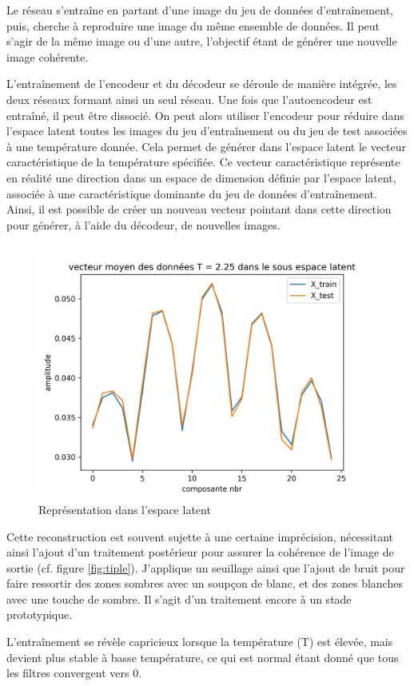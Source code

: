 \documentclass[11pt, parskip=half]{scrartcl} %
\begin{document}
Le réseau s'entraîne en partant d'une image du jeu de données d'entraînement, puis, cherche à reproduire une image du même ensemble de données. Il peut s'agir de la même image ou d'une autre, l'objectif étant de générer une nouvelle image cohérente.

L'entraînement de l'encodeur et du décodeur se déroule de manière intégrée, les deux réseaux formant ainsi un seul réseau. Une fois que l'autoencodeur est entraîné, il peut être dissocié. On peut alors utiliser l'encodeur pour réduire dans l'espace latent toutes les images du jeu d'entraînement ou du jeu de test associées à une température donnée. Cela permet de générer dans l'espace latent le vecteur caractéristique de la température spécifiée. Ce vecteur caractéristique représente en réalité une direction dans un espace de dimension définie par l'espace latent, associée à une caractéristique dominante du jeu de données d'entraînement. Ainsi, il est possible de créer un nouveau vecteur pointant dans cette direction pour générer, à l'aide du décodeur, de nouvelles images.

\begin{figure}[h]
	\centering
	\includegraphics[width=0.5\linewidth]{./figures/latent.jpg}
	\caption{Représentation dans l'espace latent}
	\label{fig:latent}
\end{figure}

Cette reconstruction est souvent sujette à une certaine imprécision, nécessitant ainsi l'ajout d'un traitement postérieur pour assurer la cohérence de l'image de sortie (cf. figure \ref{fig:tiple}). J'applique un seuillage ainsi que l'ajout de bruit pour faire ressortir des zones sombres avec un soupçon de blanc, et des zones blanches avec une touche de sombre. Il s'agit d'un traitement encore à un stade prototypique.

L'entraînement se révèle capricieux lorsque la température (T) est élevée, mais devient plus stable à basse température, ce qui est normal étant donné que tous les filtres convergent vers 0.
\end{document}
